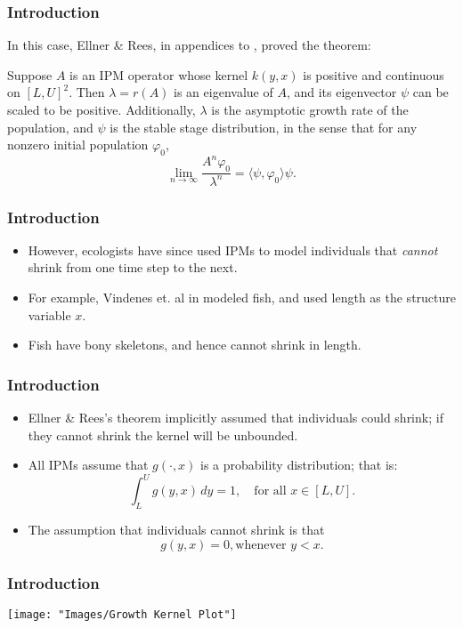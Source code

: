 \documentclass{beamer}
\begin{document}
\begin{frame}
	\frametitle{Introduction}
		In this case, Ellner \& Rees, in appendices to \cite{Ellner2006}, proved the theorem:
	\pause
	\begin{theorem}
		Suppose $A$ is an IPM operator whose kernel $k(y, x)$ is positive and continuous on $[L, U]^2$. Then $\lambda = r(A)$ is an eigenvalue of $A$, and its eigenvector $\psi$ can be scaled to be positive. Additionally, $\lambda$ is the asymptotic growth rate of the population, and $\psi$ is the stable stage distribution, in the sense that for any nonzero initial population $\varphi_0$,
		\[\lim_{n \to \infty} \frac{A^n \varphi_0}{\lambda^n} = \langle \psi, \varphi_0 \rangle \psi. \]
	\end{theorem}
\end{frame}

\begin{frame}
	\frametitle{Introduction}
	\begin{itemize}
		\item However, ecologists have since used IPMs to model individuals that \emph{cannot} shrink from one time step to the next.
		\pause
		\item For example, Vindenes et. al in \cite{Vindenes2014} modeled fish, and used length as the structure variable $x$.
		\pause
		\item Fish have bony skeletons, and hence cannot shrink in length.
	\end{itemize}
\end{frame}

\begin{frame}
	\frametitle{Introduction}
	\begin{itemize}
		\item Ellner \& Rees's theorem implicitly assumed that individuals could shrink; if they cannot shrink the kernel will be unbounded.
		\pause
		\item All IPMs assume that $g(\cdot, x)$ is a probability distribution; that is:
		\[\int_L^U g(y, x) \, dy = 1, \quad \text{for all } x \in [L,U].\]
		\pause
		\item The assumption that individuals cannot shrink is that
		\[g(y, x) = 0, \text{whenever } y < x.\]
	\end{itemize}
\end{frame}

\begin{frame}
	\frametitle{Introduction}
\begin{center}
	\texttt{[image: "Images/Growth Kernel Plot"]}
\end{center}
\end{frame}
\end{document}
